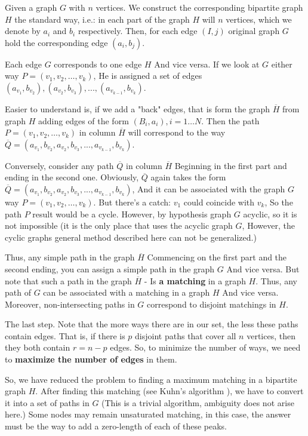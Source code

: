 Given a graph $G$ with $n$ vertices. We construct the corresponding bipartite graph $H$ the standard way, i.e.: in each part of the graph $H$ will $n$ vertices, which we denote by $a_i$ and $b_i$ respectively. Then, for each edge $(I, j)$ original graph $G$ hold the corresponding edge $(a_i, b_j)$.

Each edge $G$ corresponds to one edge $H$ And vice versa. If we look at $G$ either way $P = (v_1, v_2, \ldots, v_k)$, He is assigned a set of edges $(a_ {v_1}, b_ {v_2}), (a_ {v_2}, b_ {v_3}),..., (a_ {v_ {k-1}}, b_ {v_k})$.

Easier to understand is, if we add a "back" edges, that is form the graph $\overline H$ from graph $H$ adding edges of the form $(B_i, a_i), i = 1 \ldots N$. Then the path $P = (v_1, v_2, \ldots, v_k)$ in column $\overline H$ will correspond to the way $\overline Q = (a_ {v_1}, b_ {v_2}, a_ {v_2}, b_ {v_3},..., a_ {v_ {k-1}}, b_ {v_k})$.

Conversely, consider any path $\overline Q$ in column $\overline H$ Beginning in the first part and ending in the second one. Obviously, $\overline Q$ again takes the form $\overline Q = (a_ {v_1}, b_ {v_2}, a_ {v_2}, b_ {v_3},..., a_ {v_ {k-1}}, b_ {v_k})$, And it can be associated with the graph $G$ way $P = (v_1, v_2, \ldots, v_k)$. But there's a catch: $v_1$ could coincide with $v_k$, So the path $P$ result would be a cycle. However, by hypothesis graph $G$ acyclic, so it is not impossible (it is the only place that uses the acyclic graph $G$, However, the cyclic graphs general method described here can not be generalized.)

Thus, any simple path in the graph $\overline H$ Commencing on the first part and the second ending, you can assign a simple path in the graph $G$ And vice versa. But note that such a path in the graph $\overline H$ - Is \textbf{a matching} in a graph $H$. Thus, any path of $G$ can be associated with a matching in a graph $H$ And vice versa. Moreover, non-intersecting paths in $G$ correspond to disjoint matchings in $H$.

The last step. Note that the more ways there are in our set, the less these paths contain edges. That is, if there is $p$ disjoint paths that cover all $n$ vertices, then they both contain $r = n - p$ edges. So, to minimize the number of ways, we need to \textbf{maximize the number of edges} in them.

So, we have reduced the problem to finding a maximum matching in a bipartite graph $H$. After finding this matching (see Kuhn's algorithm ), we have to convert it into a set of paths in $G$ (This is a trivial algorithm, ambiguity does not arise here.) Some nodes may remain unsaturated matching, in this case, the answer must be the way to add a zero-length of each of these peaks.

